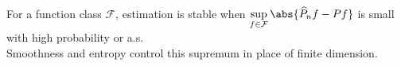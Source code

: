\begin{remark} \label{rem:complexity-controls-nonparametric-estimation} \\
For a function class $\mathcal{F}$, estimation is stable when $\sup\limits_{f\in\mathcal{F}}\abs{\widehat{P}_nf-Pf}$ is small with high probability or a.s.\\
Smoothness and entropy control this supremum in place of finite dimension.
\end{remark}
